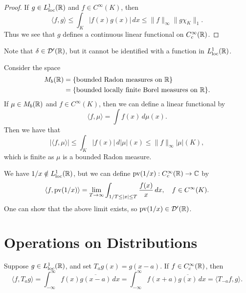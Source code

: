\begin{proof}
  If $g \in L^1_{\mathrm{loc}}(\mathbb{R})$
  and $f \in C^\infty(K)$, then
  \[
    \langle f, g \rangle
    \le \int_K |f(x) g(x)|\, dx
    \le \|f\|_\infty \|g \chi_K\|_{1}.
  \]
  Thus we see that $g$ defines a
  continuous linear functional on
  $C^\infty_c(\mathbb{R})$.
\end{proof}

\begin{example}
  Note that $\delta \in \mathcal{D}'(\mathbb{R})$,
  but it cannot be identified with a
  function in $L^1_{\mathrm{loc}}(\mathbb{R})$.
\end{example}

\begin{example}
  Consider the space
  \begin{align*}
    M_b(\mathbb{R})
    &= \{\text{bounded Radon measures on $\mathbb{R}$}\} \\
    &= \{\text{bounded locally finite Borel measures on $\mathbb{R}$}\}.
  \end{align*}
  If $\mu \in M_b(\mathbb{R})$ and $f \in C^\infty(K)$,
  then we can define a linear functional by
  \[
    \langle f, \mu \rangle
    = \int f(x) \, d\mu(x).
  \]
  Then we have that
  \[
    |\langle f, \mu \rangle|
    \le \int_K |f(x)| \, d|\mu|(x)
    \le \|f\|_\infty |\mu|(K),
  \]
  which is finite as
  $\mu$ is a bounded Radon measure.
\end{example}

\begin{example}
  We have
  $1 / x \notin L^1_{\mathrm{loc}}(\mathbb{R})$, but we
  can define
  $\operatorname{pv}(1 / x) : C^\infty_c(\mathbb{R}) \to \mathbb{C}$ by
  \[
    \langle f, \operatorname{pv}(1 / x) \rangle
    = \lim_{T \to \infty}\int_{1 / T \le |x| \le T} \frac{f(x)}{x}\, dx, \quad
    f \in C^\infty(K).
  \]
  One can show that the above limit
  exists, so $\operatorname{pv}(1 / x) \in \mathcal{D}'(\mathbb{R})$.
\end{example}

\section{Operations on Distributions}

\begin{remark}
  Suppose $g \in L^1_{\mathrm{loc}}(\mathbb{R})$, and set
  $T_a g(x) = g(x - a)$. If
  $f \in C^\infty_c(\mathbb{R})$, then
  \[
    \langle f, T_a g \rangle
    = \int_{-\infty}^\infty f(x) \overline{g(x - a)} \, dx
    = \int_{-\infty}^\infty f(x + a) \overline{g(x)} \, dx
    = \langle T_{-a} f, g \rangle.
  \]
\end{remark}

